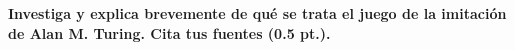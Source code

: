 \textbf{Investiga y explica brevemente de qué se trata el juego de la imitación de Alan M. Turing. Cita tus fuentes (0.5 pt.).}